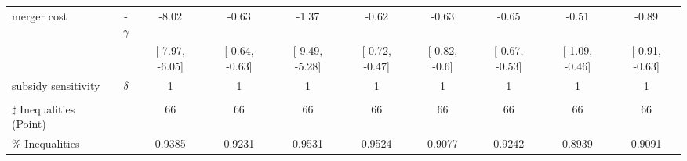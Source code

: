 \begin{tabular}{@{\extracolsep{5pt}}lccccccccc}
merger cost & -$\gamma$ & -8.02 & -0.63 & -1.37 & -0.62 & -0.63 & -0.65 & -0.51 & -0.89 \\
 &  & [-7.97, -6.05] & [-0.64, -0.63] & [-9.49, -5.28] & [-0.72, -0.47] & [-0.82, -0.6] & [-0.67, -0.53] & [-1.09, -0.46] & [-0.91, -0.63] \\
subsidy sensitivity & $\delta$ & 1 & 1 & 1 & 1 & 1 & 1 & 1 & 1 \\
 &  &  &  &  &  &  &  &  &  \\
\hline 
$\sharp$ Inequalities (Point) &  & 66 & 66 & 66 & 66 & 66 & 66 & 66 & 66 \\
\% Inequalities &  & 0.9385 & 0.9231 & 0.9531 & 0.9524 & 0.9077 & 0.9242 & 0.8939 & 0.9091 \\
\bottomrule 
\end{tabular}
